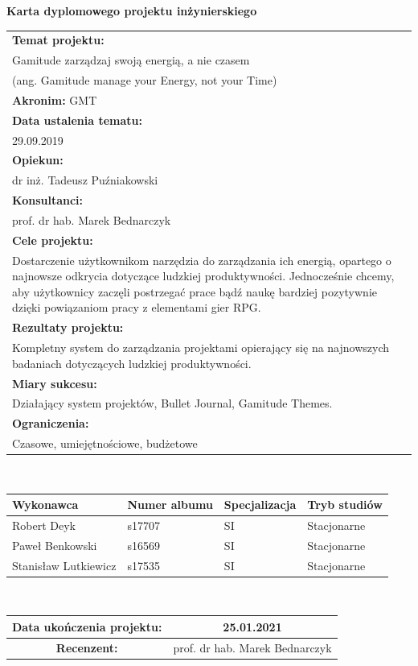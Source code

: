 \documentclass[a4paper,11pt]{report}
\begin{document}
\begin{center}
\textbf{\huge Karta dyplomowego projektu inżynierskiego}\\
\vspace{0.5cm}
\begin{tabular}{|p{14cm}|}
\hline
\textbf{Temat projektu:} \\Gamitude zarządzaj swoją energią, a nie czasem \\(ang. Gamitude manage your Energy, not your Time)\\
\hline
\textbf{Akronim:} GMT\\
\hline
\textbf{Data ustalenia tematu:}\\29.09.2019\\
\hline
\textbf{Opiekun:}\\dr inż. Tadeusz Puźniakowski  \\
\hline
\textbf{Konsultanci:}\\ prof. dr hab. Marek Bednarczyk \\
\hline
\textbf{Cele projektu:}
\\Dostarczenie użytkownikom narzędzia do zarządzania ich energią,
 opartego o najnowsze odkrycia dotyczące ludzkiej produktywności.
Jednocześnie chcemy,
 aby użytkownicy zaczęli postrzegać prace bądź naukę bardziej pozytywnie dzięki powiązaniom pracy z elementami gier RPG.\\
\hline
\textbf{Rezultaty projektu:}\\Kompletny system do zarządzania projektami opierający się na najnowszych badaniach dotyczących ludzkiej produktywności. \\
\hline
\textbf{Miary sukcesu:}\\Działający system projektów, Bullet Journal, Gamitude Themes.\\
\hline
\textbf{Ograniczenia:}\\Czasowe, umiejętnościowe, budżetowe \\
\hline
\end{tabular}\\
\vspace{0.5cm}
\begin{tabular}{|p{3.5cm}|p{3cm}|p{3cm}|p{3cm}|}
\hline
\textbf{Wykonawca} & \textbf{Numer albumu}& \textbf{Specjalizacja}& \textbf{Tryb studiów} \\
\hline
Robert Deyk&s17707&SI&Stacjonarne \\
\hline
Paweł Benkowski&s16569&SI&Stacjonarne\\
\hline
Stanisław Lutkiewicz&s17535&SI&Stacjonarne \\
\hline
\end{tabular}\\
\vspace{0.5cm}
\begin{tabular}{|c|c|}
\hline
\textbf{Data ukończenia projektu:} & 25.01.2021 \\
\hline
\textbf{Recenzent:} & prof. dr hab. Marek Bednarczyk\\
\hline
\end{tabular}
\end{center}
\tableofcontents
\end{document}
